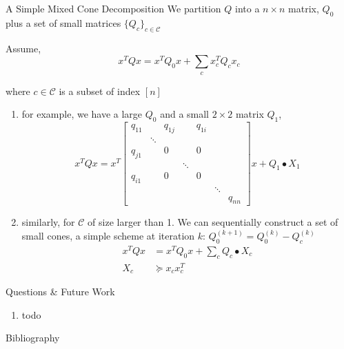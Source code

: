 \documentclass[aspectratio=1610, 10pt]{beamer}
\begin{document}
\begin{frame}[allowframebreaks]{A Simple Mixed Cone Decomposition}
  We partition \(Q\) into a \(n\times n\) matrix, \(Q_0\) plus a set of small matrices \(\{Q_c\}_{c \in \mathcal C}\)

  Assume,
  \begin{equation*}
    x^TQx = x^TQ_0x + \sum_c x_c^TQ_cx_c
  \end{equation*}

  where \(c \in \mathcal C\) is a subset of index \([n]\)

  \begin{enumerate}
    \item for example, we have a large \(Q_0\) and a small \(2\times 2\) matrix \(Q_1\),
          \begin{equation*}
            x^T Q x = x^T \begin{bmatrix}
              q_{11}  &        & q_{1 j} &        & q_{1 i} &        &         \\
                      & \ddots &         &        &         &        &         \\
              q_{j 1} &        & 0       &        & 0       &        &         \\
                      &        &         & \ddots &         &        &         \\
              q_{i 1} &        & 0       &        & 0       &        &         \\
                      &        &         &        &         & \ddots &         \\
                      &        &         &        &         &        & q_{n n}
            \end{bmatrix} x + Q_1 \bullet X_1
          \end{equation*}

          \framebreak
    \item similarly, for \(\mathcal C\) of size larger than 1. We can sequentially construct a set of small cones, a simple scheme at iteration \(k\): \(Q^{(k+1)}_0 = Q^{(k)}_0 - Q_c^{(k)}\)
          \begin{align*}
            x^TQx & = x^TQ_0x + \sum_c Q_c \bullet X_c \\
            X_c   & \succeq x_c x_c^T
          \end{align*}
  \end{enumerate}
\end{frame}

\begin{frame}[allowframebreaks]{Questions \& Future Work}
  \begin{enumerate}
    \item todo
  \end{enumerate}


\end{frame}
\begin{frame}[allowframebreaks]{Bibliography}
  
  
\end{frame}
\end{document}
